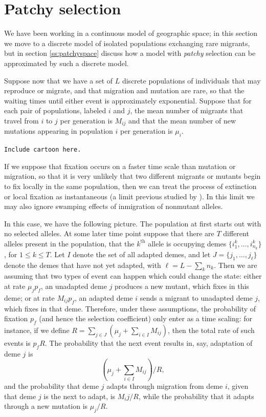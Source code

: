 \documentclass{article}
\begin{document}
\section{Patchy selection} 
\label{ss:discretedemes}

We have been working in a continuous model of geographic space; 
in this section we move to a discrete model of isolated populations exchanging rare migrants,
but in section \ref{ss:patchyspace} discuss how a model with {\em patchy} selection can be approximated by such a discrete model.

Suppose now that we have a set of $L$ discrete populations of individuals that may reproduce or migrate,
and that migration and mutation are rare, so that the waiting times until either event is approximately exponential.
Suppose that for each pair of populations, labeled $i$ and $j$, the mean number of migrants that travel from $i$ to $j$ per generation
is $M_{ij}$ and that the mean number of new mutations appearing in population $i$ per generation is $\mu_i$.

{\tt Include cartoon here.}

If we suppose that fixation occurs on a faster time scale than mutation or migration,
so that it is very unlikely that two different migrants or mutants begin to fix locally in the same population,
then we can treat the process of extinction or local fixation as instantaneous 
(a limit previous studied by \cite{Slatkin:81}).
In this limit we may also ignore swamping effects of inmigration of nonmutant alleles.

In this case, we have the following picture.
The population at first starts out with no selected alleles. 
At some later time point suppose that there are $T$ different alleles present in the population, 
that the $k^\mathrm{th}$ allele is occupying demes $\{i^k_1, \ldots, i^k_{n_k}\}$, for $1\le k \le T$.
Let $I$ denote the set of all adapted demes, 
and let $J = \{j_1, \ldots, j_\ell\}$ denote the demes that have not yet adapted, with $\ell = L - \sum_k n_k$.
Then we are assuming that two types of event can happen which could change the state:
either at rate $\mu_j p_f$, an unadapted deme $j$ produces a new mutant, which fixes in this deme;
or at rate $M_{ij} p_f$, an adapted deme $i$ sends a migrant to unadapted deme $j$, which fixes in that deme.
Therefore, under these assumptions, the probability of fixation $p_f$ (and hence the selection coefficient)
only enter as a time scaling: for instance,
if we define $R = \sum_{j \in J} \left( \mu_j + \sum_{i \in I} M_{ij} \right)$,
then the total rate of such events is $p_f R$.
The probability that the next event results in, say, adaptation of deme $j$
is 
\[
 \left( \mu_j + \sum_{i \in I} M_{ij} \right) / R,
\]
and the probability that deme $j$ adapts through migration from deme $i$, given that deme $j$ is the next to adapt, is
$M_ij / R$,
while the probability that it adapts through a new mutation is $\mu_j / R$.
\end{document}

